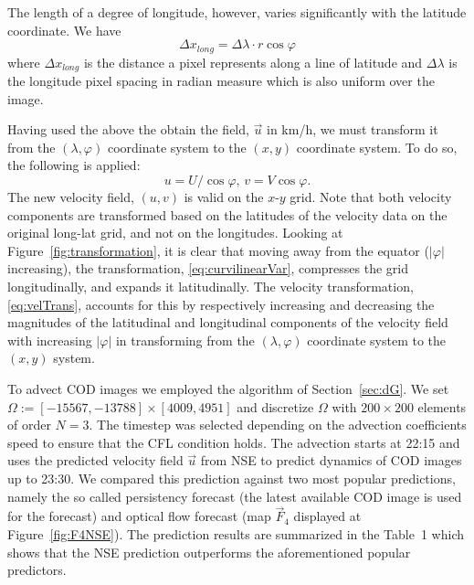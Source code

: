 \documentclass[onecolumn, 12pt, conference]{ieeeconf}
\def\F{\vec{F}}
\renewcommand{\u}{\vec{u}}
\begin{document}
The length of a degree of longitude, however, varies significantly with the latitude coordinate. We have
\begin{equation}
\label{eq:longLength}
\Delta x_{long} = \Delta \lambda \cdot r \cos \varphi
\end{equation}
where $\Delta x_{long}$ is the distance a pixel represents along a line of latitude and $\Delta \lambda$ is the longitude pixel spacing in radian measure which is also uniform over the image.

Having used the above the obtain the field, $\u$ in km/h, we must transform it from the $(\lambda,\varphi)$ coordinate system to the $(x,y)$ coordinate system. To do so, the following is applied:
\begin{equation}
\label{eq:velTrans}
u = U/ \cos \varphi, \, v = V \cos\varphi.
\end{equation}
The new velocity field, $(u,v)$ is valid on the $x$-$y$ grid. Note that both velocity components are transformed based on the latitudes of the velocity data on the original long-lat grid, and not on the longitudes. Looking at Figure~\ref{fig:transformation}, it is clear that moving away from the equator ($|\varphi|$ increasing), the transformation, \eqref{eq:curvilinearVar}, compresses the grid longitudinally, and expands it latitudinally. The velocity transformation, \eqref{eq:velTrans}, accounts for this by respectively increasing and decreasing the magnitudes of the latitudinal and longitudinal components of the velocity field with increasing $|\varphi|$ in transforming from the $(\lambda,\varphi)$ coordinate system to the $(x,y)$ system.

To advect COD images we employed the algorithm of Section~\ref{sec:dG}. We set $\Omega:=[-15567,-13788]\times[4009,4951]$ and discretize $\Omega$ with $200\times 200$ elements of order $N=3$. The timestep was selected depending on the advection coefficients speed to ensure that the CFL condition holds. The advection starts at 22:15 and uses the predicted velocity field $\u$ from NSE to predict dynamics of COD images up to 23:30. We compared this prediction against two most popular predictions, namely the so called persistency forecast (the latest available COD image is used for the forecast) and optical flow forecast (map $\F_4$ displayed at Figure~\ref{fig:F4NSE}). The prediction results are summarized in the Table~1 which shows that the NSE prediction outperforms the aforementioned popular predictors.
\end{document}
